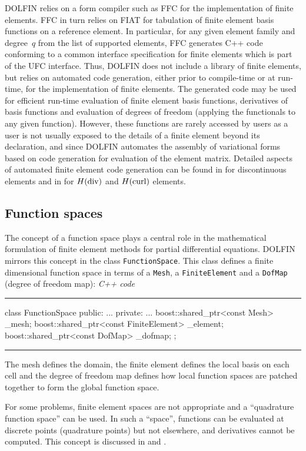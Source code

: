 \documentclass[acmtoms]{acmtrans2m}
\newenvironment{cppcode}[1]{\center\minipage{#1\textwidth}\footnotesize\hfill\it C++ code \rm\vspace{0.1cm}\hrule\renewcommand{\baselinestretch}{0.9}\footnotesize\verbatim}{\endverbatim\hrule\normalsize\endminipage\newline\endcenter}
\newcommand{\emp}[1]{\texttt{#1}}
\newcommand{\dolfin}{DOLFIN}
\begin{document}
\dolfin{} relies on a form compiler such as FFC for the implementation
of finite elements. FFC in turn relies on FIAT for tabulation of
finite element basis functions on a reference element. In particular,
for any given element family and degree~$q$ from the list of supported
elements, FFC generates C++ code conforming to a common interface
specification for finite elements which is part of the UFC
interface. Thus, \dolfin{} does not include a library of finite
elements, but relies on automated code generation, either prior to
compile-time or at run-time, for the implementation of finite
elements. The generated code may be used for efficient run-time
evaluation of finite element basis functions, derivatives of basis
functions and evaluation of degrees of freedom (applying the
functionals to any given function). However, these
functions are rarely accessed by users as a user is not usually
exposed to the details of a finite element beyond its declaration, and
since \dolfin{} automates the assembly of variational forms based on
code generation for evaluation of the element matrix. Detailed aspects
of automated finite element code generation can be found in
 for discontinuous elements and in
 for $H({\rm div})$ and $H({\rm curl})$ elements.
\subsection{Function spaces}

The concept of a function space plays a central role in the
mathematical formulation of finite element methods for partial
differential equations. \dolfin{} mirrors this concept in the class
\emp{FunctionSpace}. This class defines a finite dimensional function
space in terms of a \emp{Mesh}, a \emp{FiniteElement} and a
\emp{DofMap} (degree of freedom map):
\begin{cppcode}{0.9}
class FunctionSpace
{
public:
  ...
private:
  ...
  boost::shared_ptr<const Mesh> _mesh;
  boost::shared_ptr<const FiniteElement> _element;
  boost::shared_ptr<const DofMap> _dofmap;
};
\end{cppcode}
The mesh defines the domain, the finite element defines the local
basis on each cell and the degree of freedom map defines how local
function spaces are patched together to form the global function
space.


For some
problems, finite element spaces are not appropriate and
a ``quadrature function space''
can be used. In such a ``space'', functions can be evaluated at discrete
points (quadrature points) but not elsewhere, and derivatives cannot
be computed. This concept is discussed in 
and .
\end{document}
